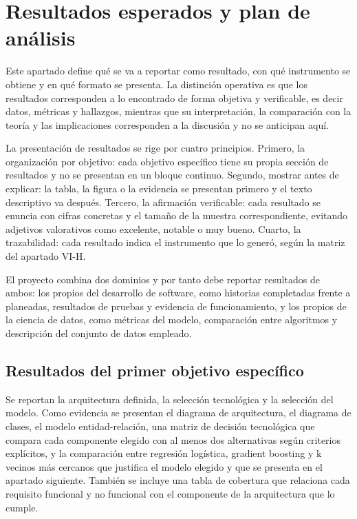 \documentclass[conference]{IEEEtran}
\begin{document}
\section{Resultados esperados y plan de análisis}
Este apartado define qué se va a reportar como resultado, con qué instrumento se obtiene y en qué formato se presenta. La distinción operativa es que los resultados corresponden a lo encontrado de forma objetiva y verificable, es decir datos, métricas y hallazgos, mientras que su interpretación, la comparación con la teoría y las implicaciones corresponden a la discusión y no se anticipan aquí.

La presentación de resultados se rige por cuatro principios. Primero, la organización por objetivo: cada objetivo específico tiene su propia sección de resultados y no se presentan en un bloque continuo. Segundo, mostrar antes de explicar: la tabla, la figura o la evidencia se presentan primero y el texto descriptivo va después. Tercero, la afirmación verificable: cada resultado se enuncia con cifras concretas y el tamaño de la muestra correspondiente, evitando adjetivos valorativos como excelente, notable o muy bueno. Cuarto, la trazabilidad: cada resultado indica el instrumento que lo generó, según la matriz del apartado VI-H.

El proyecto combina dos dominios y por tanto debe reportar resultados de ambos: los propios del desarrollo de software, como historias completadas frente a planeadas, resultados de pruebas y evidencia de funcionamiento, y los propios de la ciencia de datos, como métricas del modelo, comparación entre algoritmos y descripción del conjunto de datos empleado.

\subsection{Resultados del primer objetivo específico}
Se reportan la arquitectura definida, la selección tecnológica y la selección del modelo. Como evidencia se presentan el diagrama de arquitectura, el diagrama de clases, el modelo entidad-relación, una matriz de decisión tecnológica que compara cada componente elegido con al menos dos alternativas según criterios explícitos, y la comparación entre regresión logística, gradient boosting y k vecinos más cercanos que justifica el modelo elegido y que se presenta en el apartado siguiente. También se incluye una tabla de cobertura que relaciona cada requisito funcional y no funcional con el componente de la arquitectura que lo cumple.
\end{document}

